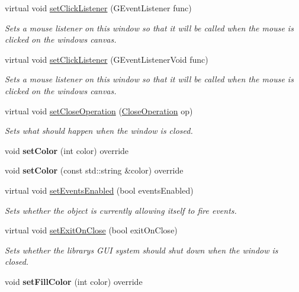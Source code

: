 \begin{DoxyCompactItemize}
virtual void \mbox{\hyperlink{classGWindow_abd40af6921242584d0954f173911b190}{set\+Click\+Listener}} (G\+Event\+Listener func)
\begin{DoxyCompactList}\small\item\em Sets a mouse listener on this window so that it will be called when the mouse is clicked on the window\textquotesingle{}s canvas. \end{DoxyCompactList}\item 
virtual void \mbox{\hyperlink{classGWindow_a856414c92df90f56f3877475eb3f8fc4}{set\+Click\+Listener}} (G\+Event\+Listener\+Void func)
\begin{DoxyCompactList}\small\item\em Sets a mouse listener on this window so that it will be called when the mouse is clicked on the window\textquotesingle{}s canvas. \end{DoxyCompactList}\item 
virtual void \mbox{\hyperlink{classGWindow_a8163e9440d0fb801a63ae9b3c90d5969}{set\+Close\+Operation}} (\mbox{\hyperlink{classGWindow_a84803201f0f9569db61f51cac9e0d2d2}{Close\+Operation}} op)
\begin{DoxyCompactList}\small\item\em Sets what should happen when the window is closed. \end{DoxyCompactList}\item 
void {\bfseries set\+Color} (int color) override
\item 
void {\bfseries set\+Color} (const std\+::string \&color) override
\item 
virtual void \mbox{\hyperlink{classGObservable_afaa30b2a9e0f378fd1c70d2f1d0b8216}{set\+Events\+Enabled}} (bool events\+Enabled)
\begin{DoxyCompactList}\small\item\em Sets whether the object is currently allowing itself to fire events. \end{DoxyCompactList}\item 
virtual void \mbox{\hyperlink{classGWindow_abad01a63e29c19aee274af1b36209838}{set\+Exit\+On\+Close}} (bool exit\+On\+Close)
\begin{DoxyCompactList}\small\item\em Sets whether the library\textquotesingle{}s G\+UI system should shut down when the window is closed. \end{DoxyCompactList}\item 
void {\bfseries set\+Fill\+Color} (int color) override
\item 

\end{DoxyCompactItemize}
